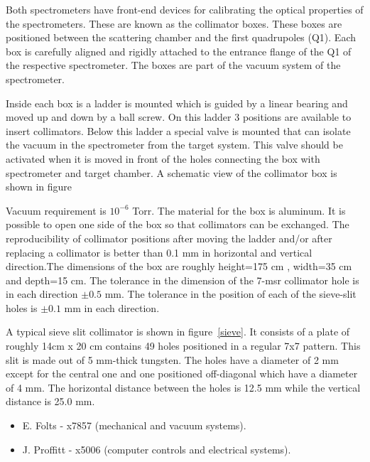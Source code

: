 

Both spectrometers have front-end devices  for calibrating the optical
properties of the spectrometers. These are known as the collimator boxes.
These boxes are positioned between the scattering chamber and the 
first quadrupoles (Q1). Each box is carefully aligned and rigidly attached
to the  entrance flange of the Q1 of the respective spectrometer.  The boxes are
part of the vacuum system of the spectrometer.


Inside each box is a ladder is mounted which is guided by a linear bearing
and moved up and down by a ball screw. On this ladder 3 positions are 
available to insert collimators. Below this ladder
a special valve is mounted that can isolate the vacuum in the spectrometer
from the target system. This valve should be activated when it is moved
in front of the holes connecting the box with spectrometer and target chamber.
A schematic view of the collimator box is shown in figure%



Vacuum requirement is $10^{-6}$ Torr. The material for the box is 
aluminum. It is possible to open one side of the box so that
collimators can be exchanged. The reproducibility of collimator positions after moving
the ladder and/or after replacing a collimator is
better than 0.1 mm in horizontal and vertical direction.The dimensions of the box are
roughly height=175 cm , width=35 cm and depth=15 cm. The tolerance in the dimension
of the 7-msr collimator hole is in each direction $\pm0.5$ mm. The tolerance in the position
of each of the sieve-slit holes is $\pm0.1$ mm in each direction.



A typical sieve slit collimator is shown in figure~\ref{sieve}. It consists of 
a plate of roughly 14cm x 20 cm contains 49 holes
positioned in a regular 7x7 pattern. This slit is made out of 5 mm-thick tungsten.
The holes have a diameter of 2 mm except for the central one and one positioned
off-diagonal which have a diameter of 4 mm. The horizontal distance between the
holes is 12.5 mm while the vertical distance is 25.0 mm.



\begin{itemize} 
\item[~]E. Folts - x7857 (mechanical and vacuum systems).
\item[~]J. Proffitt - x5006 (computer controls and electrical systems).
\end{itemize} 


